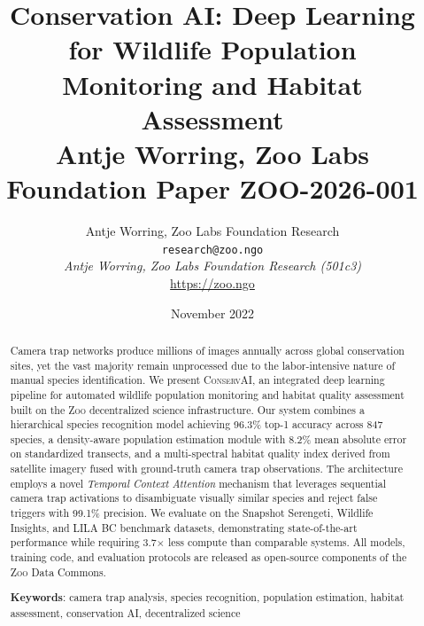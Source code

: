 \documentclass[11pt,letterpaper]{article}
\title{\textbf{Conservation AI: Deep Learning for Wildlife Population\\Monitoring and Habitat Assessment}\\
\large Antje Worring, Zoo Labs Foundation Paper ZOO-2026-001}
\author{
Antje Worring, Zoo Labs Foundation Research\\
\texttt{research@zoo.ngo}\\[6pt]
\textit{Antje Worring, Zoo Labs Foundation Research (501c3)}\\
\url{https://zoo.ngo}
}
\date{November 2022}
\newcommand{\Zoo}{\textsc{Zoo}}
\newcommand{\ConservAI}{\textsc{ConservAI}}
\begin{document}
\zoocoverpage

\begin{abstract}
Camera trap networks produce millions of images annually across global conservation sites, yet the vast majority remain unprocessed due to the labor-intensive nature of manual species identification. We present \ConservAI{}, an integrated deep learning pipeline for automated wildlife population monitoring and habitat quality assessment built on the \Zoo{} decentralized science infrastructure. Our system combines a hierarchical species recognition model achieving 96.3\% top-1 accuracy across 847 species, a density-aware population estimation module with 8.2\% mean absolute error on standardized transects, and a multi-spectral habitat quality index derived from satellite imagery fused with ground-truth camera trap observations. The architecture employs a novel \emph{Temporal Context Attention} mechanism that leverages sequential camera trap activations to disambiguate visually similar species and reject false triggers with 99.1\% precision. We evaluate on the Snapshot Serengeti, Wildlife Insights, and LILA BC benchmark datasets, demonstrating state-of-the-art performance while requiring 3.7$\times$ less compute than comparable systems. All models, training code, and evaluation protocols are released as open-source components of the \Zoo{} Data Commons.

\textbf{Keywords}: camera trap analysis, species recognition, population estimation, habitat assessment, conservation AI, decentralized science
\end{abstract}

\tableofcontents










\end{document}
